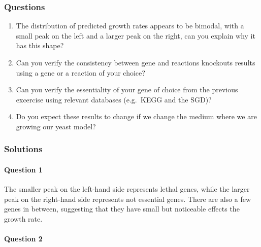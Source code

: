 \documentclass[11pt]{article}
\providecommand{\tightlist}{%
      \setlength{\itemsep}{0pt}\setlength{\parskip}{0pt}}
\begin{document}
    \hypertarget{questions}{%
\subsubsection{Questions}\label{questions}}

    \begin{enumerate}
\def\labelenumi{\arabic{enumi}.}
\tightlist
\item
  The distribution of predicted growth rates appears to be bimodal, with
  a small peak on the left and a larger peak on the right, can you
  explain why it has this shape?
\item
  Can you verify the consistency between gene and reactions knockouts
  results using a gene or a reaction of your choice?
\item
  Can you verify the essentiality of your gene of choice from the
  previous excercise using relevant databases (e.g.~KEGG and the SGD)?
\item
  Do you expect these results to change if we change the medium where we
  are growing our yeast model?
\end{enumerate}

    \hypertarget{solutions}{%
\subsubsection{Solutions}\label{solutions}}

\hypertarget{question-1}{%
\paragraph{Question 1}\label{question-1}}

The smaller peak on the left-hand side represents lethal genes, while
the larger peak on the right-hand side represents not essential genes.
There are also a few genes in between, suggesting that they have small
but noticeable effects the growth rate.

\hypertarget{question-2}{%
\paragraph{Question 2}\label{question-2}}
\end{document}
